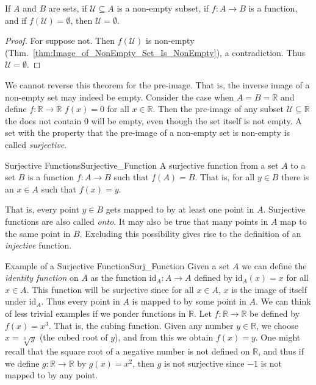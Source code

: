     \begin{theorem}
        If $A$ and $B$ are sets, if $\mathcal{U}\subseteq{A}$ is a non-empty
        subset, if $f:A\rightarrow{B}$ is a function, and if
        $f(\mathcal{U})=\emptyset$, then $\mathcal{U}=\emptyset$.
    \end{theorem}
    \begin{proof}
        For suppose not. Then $f(\mathcal{U})$ is non-empty
        (Thm.~\ref{thm:Image_of_NonEmpty_Set_Is_NonEmpty}), a contradiction.
        Thus $\mathcal{U}=\emptyset$.
    \end{proof}
    We cannot reverse this theorem for the pre-image. That is, the inverse image
    of a non-empty set may indeed be empty. Consider the case when
    $A=B=\mathbb{R}$ and define $f:\mathbb{R}\rightarrow\mathbb{R}$
    $f(x)=0$ for all $x\in\mathbb{R}$. Then the pre-image of any subset
    $\mathcal{U}\subseteq\mathbb{R}$ the does not contain 0 will be empty, even
    though the set itself is not empty. A set with the property that the
    pre-image of a non-empty set is non-empty is called \textit{surjective}.
    \begin{fdefinition}{Surjective Functions}{Surjective_Function}
        A \gls{surjective function} from a \gls{set} $A$ to a set $B$ is a
        \gls{function} $f:A\rightarrow{B}$ such that $f(A)=B$. That is, for all
        $y\in{B}$ there is an $x\in{A}$ such that $f(x)=y$.
    \end{fdefinition}
    That is, every point $y\in{B}$ gets mapped to by at least one point in $A$.
    Surjective functions are also called \textit{onto}. It may also be true that
    many points in $A$ map to the same point in $B$. Excluding this possibility
    gives rise to the definition of an \textit{injective} function.
    \begin{lexample}{Example of a Surjective Function}{Surj_Function}
        Given a set $A$ we can define the \textit{identity function} on $A$ as
        the function $\textrm{id}_{A}:A\rightarrow{A}$ defined by
        $\textrm{id}_{A}(x)=x$ for all $x\in{A}$. This function will be
        surjective since for all $x\in{A}$, $x$ is the image of itself under
        $\textrm{id}_{A}$. Thus every point in $A$ is mapped to by some point
        in $A$. We can think of less trivial examples if we ponder functions in
        $\mathbb{R}$. Let $f:\mathbb{R}\rightarrow\mathbb{R}$ be defined by
        $f(x)=x^{3}$. That is, the cubing function. Given any number
        $y\in\mathbb{R}$, we choose $x=\sqrt[3]{y}$ (the cubed root of $y$),
        and from this we obtain $f(x)=y$. One might recall that the square root
        of a negative number is not defined on $\mathbb{R}$, and thus if we
        define $g:\mathbb{R}\rightarrow\mathbb{R}$ by $g(x)=x^{2}$, then $g$ is
        not surjective since $\minus{1}$ is not mapped to by any point.
    \end{lexample}    
